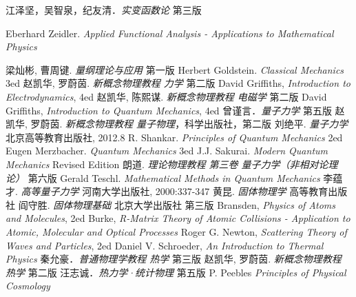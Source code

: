 \begin{thebibliography}{99}
江泽坚，吴智泉，纪友清．\textsl{实变函数论} 第三版

Eberhard Zeidler. \textsl{Applied Functional Analysis - Applications to Mathematical Physics}

梁灿彬, 曹周键. \textsl{量纲理论与应用} 第一版
Herbert Goldstein. \textsl{Classical Mechanics} 3ed
赵凯华, 罗蔚茵. \textsl{新概念物理教程 力学} 第二版
David Griffiths, \textsl{Introduction to Electrodynamics}, 4ed
赵凯华, 陈熙谋. \textsl{新概念物理教程 电磁学} 第二版
David Griffiths, \textsl{Introduction to Quantum Mechanics}, 4ed
曾谨言．\textsl{量子力学} 第五版
赵凯华, 罗蔚茵. \textsl{新概念物理教程 量子物理}，科学出版社，第二版
刘绝平. \textsl{量子力学} 北京高等教育出版社, 2012.8
R. Shankar. \textsl{Principles of Quantum Mechanics} 2ed
Eugen Merzbacher. \textsl{Quantum  Mechanics} 3ed
J.J. Sakurai. \textsl{Modern Quantum Mechanics} Revised Edition
朗道. \textsl{理论物理教程 第三卷 量子力学（非相对论理论）} 第六版
Gerald Teschl. \textsl{Mathematical Methods in Quantum Mechanics}
李蕴才. \textsl{高等量子力学} 河南大学出版社, 2000:337-347
黄昆. \textsl{固体物理学} 高等教育出版社
阎守胜. \textsl{固体物理基础} 北京大学出版社 第三版
Bransden, \textsl{Physics of Atoms and Molecules}, 2ed
Burke, \textsl{R-Matrix Theory of Atomic Collisions - Application to Atomic, Molecular and Optical Processes}
Roger G. Newton, \textsl{Scattering Theory of Waves and Particles}, 2ed
Daniel V. Schroeder, \textsl{An Introduction to Thermal Physics}
秦允豪．\textsl{普通物理学教程 热学} 第三版
赵凯华, 罗蔚茵. \textsl{新概念物理教程 热学} 第二版
汪志诚．\textsl{热力学·统计物理}  第五版
P. Peebles \textsl{Principles of Physical Cosmology}

\end{thebibliography}
